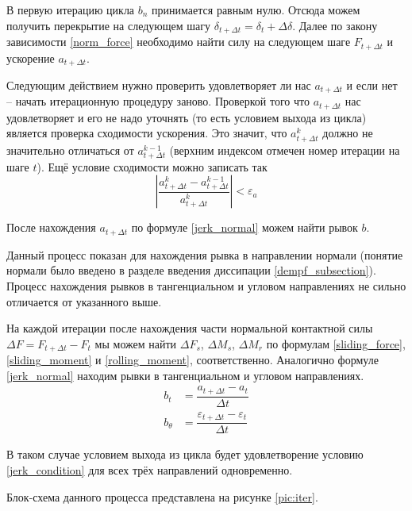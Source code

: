 \documentclass[a4paper]{article}
\begin{document}
В первую итерацию цикла $b_n$ принимается равным нулю.
Отсюда можем получить перекрытие на следующем шагу $\delta_{t + \Delta t} = \delta_t + \Delta \delta$.
Далее по закону зависимости \ref{norm_force} необходимо найти силу на следующем шаге $F_{t + \Delta t}$ и ускорение $a_{t + \Delta t}$.

Следующим действием нужно проверить удовлетворяет ли нас $a_{t + \Delta t}$ и если нет -- начать итерационную процедуру заново.
Проверкой того что $a_{t + \Delta t}$ нас удовлетворяет и его не надо уточнять (то есть условием выхода из цикла) является проверка сходимости ускорения.
Это значит, что $a_{t + \Delta t}^k$ должно не значительно отличаться от  $a_{t + \Delta t}^{k-1}$ (верхним индексом отмечен номер итерации на шаге $t$). 
Ещё условие сходимости можно записать так
\begin{equation}
\label{jerk_condition}
\left| \dfrac{a_{t + \Delta t}^k - a_{t + \Delta t}^{k-1}}{a_{t + \Delta t}^k} \right| < \varepsilon_a
\end{equation}

После нахождения $a_{t + \Delta t}$ по формуле \ref{jerk_normal} можем найти рывок $b$.

Данный процесс показан для нахождения рывка в направлении нормали (понятие нормали было введено в разделе введения  диссипации \ref{dempf_subsection}). 
Процесс нахождения рывков в тангенциальном и угловом направлениях не сильно отличается от указанного выше.

На каждой итерации после нахождения части нормальной контактной силы $\Delta F = F_{t+\Delta t} - F_t$  мы можем найти $\Delta F_s$, $\Delta M_s$, $\Delta M_r$ по формулам \ref{sliding_force}, \ref{sliding_moment} и \ref{rolling_moment}, соответственно.
Аналогично формуле \ref{jerk_normal} находим рывки в тангенциальном и угловом направлениях.
\begin{align}
b_t &= \dfrac{a_{t + \Delta t} - a_{t}}{\Delta t} \label{jerk_tangent}\\
b_{\theta} &= \dfrac{\varepsilon_{t + \Delta t} - \varepsilon_{t}}{\Delta t} \label{jerk_angular}
\end{align}

В таком случае условием выхода из цикла будет удовлетворение условию \ref{jerk_condition} для всех трёх направлений одновременно.

Блок-схема данного процесса представлена на рисунке \ref{pic:iter}.
\end{document}
